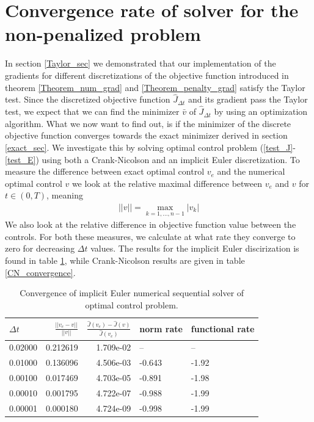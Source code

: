 \section{Convergence rate of solver for the non-penalized problem}
In section \ref{Taylor_sec} we demonstrated that our implementation of the gradients for different discretizations of the objective function introduced in theorem \ref{Theorem_num_grad} and \ref{Theorem_penalty_grad} satisfy the Taylor test. Since the discretized objective function $\hat J_{\Delta t}$ and its gradient pass the Taylor test, we expect that we can find the minimizer $\bar v$ of $\hat J_{\Delta t}$ by using an optimization algorithm. What we now want to find out, is if the minimizer of the discrete objective function converges towards the exact minimizer derived in section \ref{exact_sec}. We investigate this by solving optimal control problem (\ref{test_J}-\ref{test_E}) using both a Crank-Nicolson and an implicit Euler discretization. To measure the difference between exact optimal control $v_e$ and the numerical optimal control $v$ we look at the relative maximal difference between $v_e$ and $v$ for $t\in(0,T)$, meaning
\begin{align}
||v|| = \max_{k=1,...,n-1}|v_k| \label{inner_norm}
\end{align} 
We also look at the relative difference in objective function value between the controls. For both these measures, we calculate at what rate they converge to zero for decreasing $\Delta t$ values. The results for the implicit Euler discirization is found in table \ref{IE_convergence}, while Crank-Nicolson results are given in table \ref{CN_convergence}.
\begin{table}[!h]
\caption{Convergence of implicit Euler numerical sequential solver of optimal control problem.}\label{IE_convergence}
\centering
\begin{tabular}{lrrll}
\toprule
{} $\Delta t$&    $\frac{||v_e-v||}{||v||}$ &  $\frac{\hat J(v_e)-\hat J(v)}{\hat J(v_e)}$ &   norm rate &    functional rate \\
\midrule
0.02000 &  0.212619 &  1.709e-02 &        -- &       -- \\
0.01000 &  0.136096 &  4.506e-03 & -0.643 & -1.92 \\
0.00100 &  0.017469 &  4.703e-05 & -0.891 & -1.98 \\
0.00010 &  0.001795 &  4.722e-07 &   -0.988 & -1.99 \\
0.00001 &  0.000180 &  4.724e-09 &  -0.998 & -1.99 \\
\bottomrule
\end{tabular}
\end{table}
